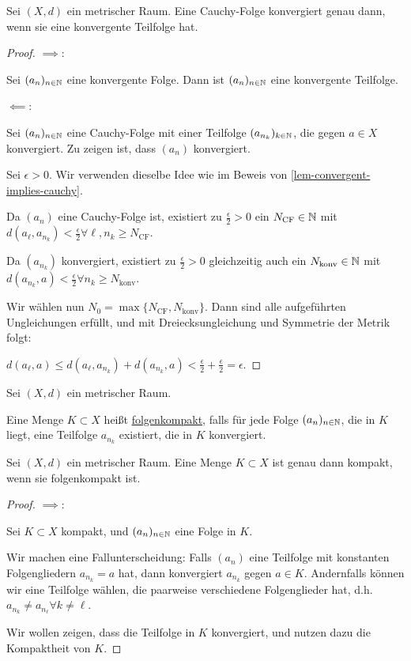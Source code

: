 \begin{lemma}[lemma]
    \label{lem-cauchy-convergent-subsequence}
    Sei $(X, d)$ ein metrischer Raum. Eine Cauchy-Folge konvergiert genau dann, wenn sie eine konvergente Teilfolge hat.
\end{lemma}
\begin{proof}
    \underline{$\implies$}:

    Sei $(a_n)_{n \in \mathbb{N}}$ eine konvergente Folge. Dann ist $(a_n)_{n \in \mathbb{N}}$ eine konvergente Teilfolge.

    \underline{$\impliedby$}:

    Sei $(a_n)_{n \in \mathbb{N}}$ eine Cauchy-Folge mit einer Teilfolge $(a_{n_k})_{k \in \mathbb{N}}$, die gegen $a \in X$ konvergiert. Zu zeigen ist, dass $(a_n)$ konvergiert.

    Sei $\epsilon > 0$. Wir verwenden dieselbe Idee wie im Beweis von \ref{lem-convergent-implies-cauchy}.
    
    Da $(a_n)$ eine Cauchy-Folge ist, existiert zu $\frac{\epsilon}{2} > 0$ ein $N_{\text{CF}} \in \mathbb{N}$ mit $d(a_{\ell}, a_{n_k}) < \frac{\epsilon}{2} \forall \ell, n_k \geq N_{\text{CF}}$.
    
    Da $(a_{n_k})$ konvergiert, existiert zu $\frac{\epsilon}{2} > 0$ gleichzeitig auch ein $N_{\text{konv}} \in \mathbb{N}$ mit $d(a_{n_k}, a) < \frac{\epsilon}{2} \forall n_k \geq N_{\text{konv}}$.

    Wir wählen nun $N_0 = \max\{N_{\text{CF}}, N_{\text{konv}}\}$. Dann sind alle aufgeführten Ungleichungen erfüllt, und mit Dreiecksungleichung und Symmetrie der Metrik folgt:
    
    $d(a_{\ell}, a) \leq d(a_{\ell}, a_{n_k}) + d(a_{n_k}, a) < \frac{\epsilon}{2} + \frac{\epsilon}{2} = \epsilon$.
\end{proof}

\begin{definition}[folgenkompakt]
    Sei $(X, d)$ ein metrischer Raum.

    Eine Menge $K \subset X$ heißt \underline{folgenkompakt}, falls für jede Folge $(a_n)_{n \in \mathbb{N}}$, die in $K$ liegt, eine Teilfolge $a_{n_k}$ existiert, die in $K$ konvergiert.
\end{definition}

\begin{proposition}
    Sei $(X, d)$ ein metrischer Raum. Eine Menge $K \subset X$ ist genau dann kompakt, wenn sie folgenkompakt ist.
\end{proposition}
\begin{proof}
    \underline{$\implies$}:

    Sei $K \subset X$ kompakt, und $(a_n)_{n \in \mathbb{N}}$ eine Folge in $K$.

    Wir machen eine Fallunterscheidung: Falls $(a_n)$ eine Teilfolge mit konstanten Folgengliedern $a_{n_k} = a$ hat, dann konvergiert $a_{n_k}$ gegen $a \in K$. Andernfalls können wir eine Teilfolge wählen, die paarweise verschiedene Folgenglieder hat, d.h. $a_{n_k} \neq a_{n_{\ell}} \forall k \neq \ell$.

    Wir wollen zeigen, dass die Teilfolge in $K$ konvergiert, und nutzen dazu die Kompaktheit von $K$.
\end{proof}

